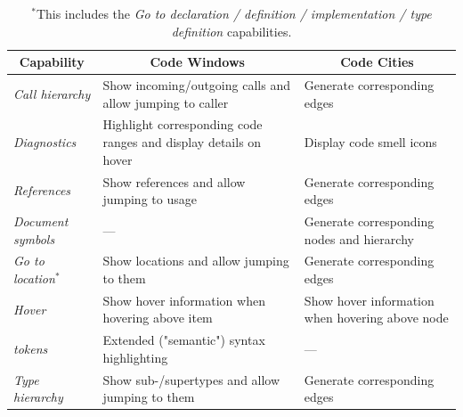 \documentclass[../thesis]{subfiles}
\begin{document}
\begin{table}[htbp]
	\caption{\gls{lsp} \glspl{capability} that will be integrated into \SEE{} as part of this thesis.}\label{tab:capabilities}
	\begin{tabularx}{\textwidth}{@{}lXX@{}}
		\toprule
		\multicolumn{1}{c}{\textbf{Capability}} & \multicolumn{1}{c}{\textbf{Code Windows}}                               & \multicolumn{1}{c}{\textbf{Code Cities}}            \\ \midrule
		\textit{Call hierarchy}                 & Show incoming/outgoing calls and allow jumping to caller                & Generate corresponding edges                        \\
		\textit{Diagnostics}                    & Highlight corresponding code \glspl{range} and display details on hover & Display code smell icons~\cite[see][]{galperin2021} \\
		\textit{References}                     & Show references and allow jumping to usage                              & Generate corresponding edges                        \\
		\textit{Document symbols}               & ---                                                                     & Generate corresponding nodes and hierarchy          \\
		\textit{Go to location$^*$}             & Show locations and allow jumping to them                                & Generate corresponding edges                        \\
		\textit{Hover}                          & Show hover information when hovering above item                         & Show hover information when hovering above node     \\
		\textit{\Glspl{token}}                  & Extended ("semantic") syntax highlighting                               & ---                                                 \\
		\textit{Type hierarchy}                 & Show sub-/supertypes and allow jumping to them                          & Generate corresponding edges                        \\\bottomrule
	\end{tabularx}
	\caption*{\footnotesize $^*$This includes the \textit{Go to declaration / definition / implementation / type definition} capabilities.}
\end{table}
\end{document}
